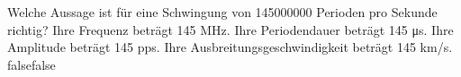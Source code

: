     {Welche Aussage ist für eine Schwingung von 145000000 Perioden pro Sekunde richtig?}
    {Ihre Frequenz beträgt 145 MHz.}
    {Ihre Periodendauer beträgt 145 \si{\micro\second}.}
    {Ihre Amplitude beträgt 145 pps.}
    {Ihre Ausbreitungsgeschwindigkeit beträgt 145 km/s.}
    {false}{false}